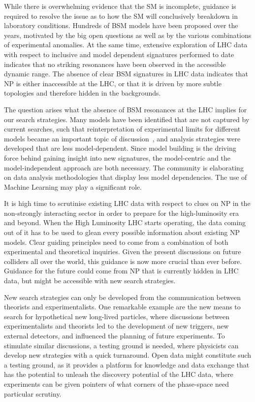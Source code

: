 \documentclass[10pt]{article}
\begin{document}
While there is overwhelming evidence that the SM is incomplete, guidance is required to resolve the issue as to how the SM will conclusively breakdown in laboratory conditions.
Hundreds of BSM models have been proposed over the years, motivated by the big open questions as well as by the various combinations of experimental anomalies.
At the same time, extensive exploration of LHC data with respect to inclusive and model dependent signatures performed to date indicates that no striking resonances have been observed in the accessible dynamic range. 
The absence of clear BSM signatures in LHC data indicates that NP is either inaccessible at the LHC, or that it is driven by more subtle topologies and therefore hidden in the backgrounds.

The question arises what the absence of BSM resonances at the LHC implies for our search strategies.
Many models have been identified that are not captured by current searches, such that reinterpretation of experimental limits for different models became an important topic of discussion~\cite{LHCReinterpretationForum:2020xtr,Kraml:2012sg}, and analysis strategies were developed that are less model-dependent.
Since model building is the driving force behind gaining insight into new signatures, the model-centric and the model-independent approach are both necessary. The community is elaborating on data analysis methodologies that display less model dependencies. The use of Machine Learning may play a significant role.

It is high time to scrutinise existing LHC data with respect to clues on NP in the non-strongly interacting sector in order to prepare for the high-luminosity era and beyond.
When the High Luminosity LHC starts operating, the data coming out of it has to be used to glean every possible information about existing NP models.
Clear guiding principles need to come from a combination of both experimental and theoretical inquiries.
Given the present discussions on future colliders all over the world, this guidance is now more crucial than ever before.
Guidance for the future could come from NP that is currently hidden in LHC data, but might be accessible with new search strategies.

New search strategies can only be developed from the communication between theorists and experimentalists.
One remarkable example are the new means to search for hypothetical new long-lived particles, where discussions between experimentalists and theorists led to the development of new triggers, new external detectors, and influenced the planning of future experiments.
To stimulate similar discussions, a testing ground is needed, where physicists can develop new strategies with a quick turnaround.
Open data might constitute such a testing ground, as it provides a platform for knowledge and data exchange that has the potential to unleash the discovery potential of the LHC data, where experiments can be given pointers of what corners of the phase-space need particular scrutiny. 
\end{document}
